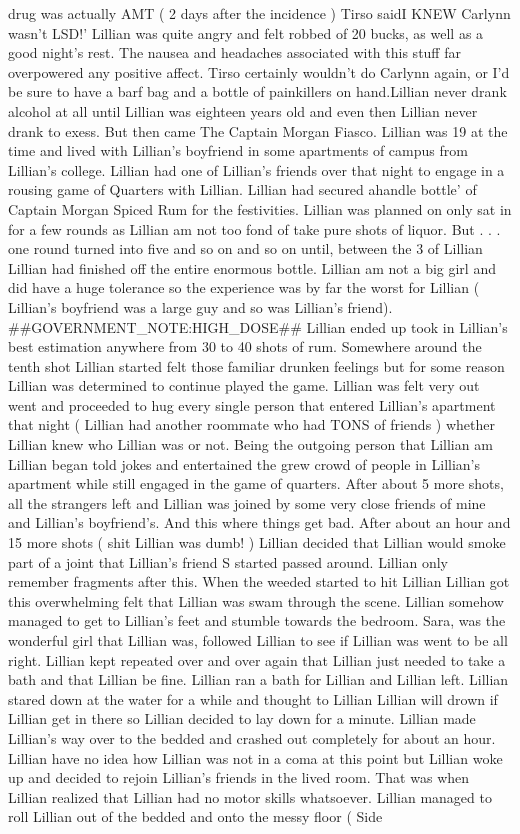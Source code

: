 \documentclass[12pt]{book}
\begin{document}
drug was actually AMT ( 2 days after the incidence ) Tirso saidI KNEW Carlynn wasn't LSD!' Lillian was quite angry and felt robbed of 20 bucks, as well as a good night's rest. The nausea and headaches associated with this stuff far overpowered any positive affect. Tirso certainly wouldn't do Carlynn again, or I'd be sure to have a barf bag and a bottle of painkillers on hand.Lillian never drank alcohol at all until Lillian was eighteen years old and even then Lillian never drank to exess. But then came The Captain Morgan Fiasco. Lillian was 19 at the time and lived with Lillian's boyfriend in some apartments of campus from Lillian's college. Lillian had one of Lillian's friends over that night to engage in a rousing game of Quarters with Lillian. Lillian had secured ahandle bottle' of Captain Morgan Spiced Rum for the festivities. Lillian was planned on only sat in for a few rounds as Lillian am not too fond of take pure shots of liquor. But . . .  one round turned into five and so on and so on until, between the 3 of Lillian Lillian had finished off the entire enormous bottle. Lillian am not a big girl and did have a huge tolerance so the experience was by far the worst for Lillian ( Lillian's boyfriend was a large guy and so was Lillian's friend). \#\#GOVERNMENT\_NOTE:HIGH\_DOSE\#\# Lillian ended up took in Lillian's best estimation anywhere from 30 to 40 shots of rum. Somewhere around the tenth shot Lillian started felt those familiar drunken feelings but for some reason Lillian was determined to continue played the game. Lillian was felt very out went and proceeded to hug every single person that entered Lillian's apartment that night ( Lillian had another roommate who had TONS of friends ) whether Lillian knew who Lillian was or not. Being the outgoing person that Lillian am Lillian began told jokes and entertained the grew crowd of people in Lillian's apartment while still engaged in the game of quarters. After about 5 more shots, all the strangers left and Lillian was joined by some very close friends of mine and Lillian's boyfriend's. And this where things get bad. After about an hour and 15 more shots ( shit Lillian was dumb! ) Lillian decided that Lillian would smoke part of a joint that Lillian's friend S started passed around. Lillian only remember fragments after this. When the weeded started to hit Lillian Lillian got this overwhelming felt that Lillian was swam through the scene. Lillian somehow managed to get to Lillian's feet and stumble towards the bedroom. Sara, was the wonderful girl that Lillian was, followed Lillian to see if Lillian was went to be all right. Lillian kept repeated over and over again that Lillian just needed to take a bath and that Lillian be fine. Lillian ran a bath for Lillian and Lillian left. Lillian stared down at the water for a while and thought to Lillian Lillian will drown if Lillian get in there so Lillian decided to lay down for a minute. Lillian made Lillian's way over to the bedded and crashed out completely for about an hour. Lillian have no idea how Lillian was not in a coma at this point but Lillian woke up and decided to rejoin Lillian's friends in the lived room. That was when Lillian realized that Lillian had no motor skills whatsoever. Lillian managed to roll Lillian out of the bedded and onto the messy floor ( Side 
\end{document}
